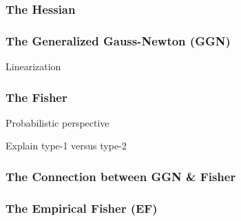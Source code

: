 \subsubsection{The Hessian}

\subsubsection{The Generalized Gauss-Newton (GGN)}
Linearization

\subsubsection{The Fisher}
Probabilistic perspective

Explain type-1 versus type-2
\subsubsection{The Connection between GGN \& Fisher}
\subsubsection{The Empirical Fisher (EF)}

